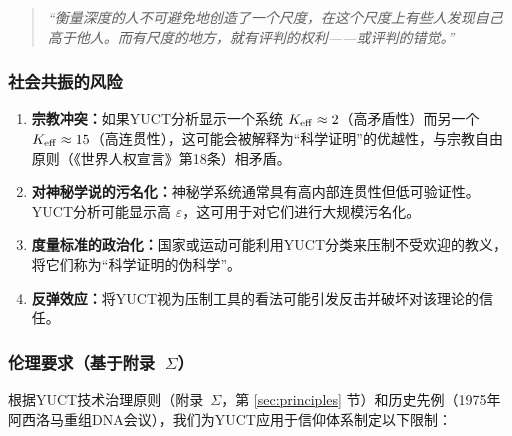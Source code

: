\documentclass[11pt,a4paper]{article}
\newcommand{\eps}{\varepsilon}
\begin{document}
	\begin{quote}
		\itshape
		“衡量深度的人不可避免地创造了一个尺度，在这个尺度上有些人发现自己高于他人。而有尺度的地方，就有评判的权利——或评判的错觉。”
	\end{quote}
	
	\subsubsection{社会共振的风险}
	
	\begin{enumerate}
		\item \textbf{宗教冲突：}如果YUCT分析显示一个系统 $\Keff \approx 2$（高矛盾性）而另一个 $\Keff \approx 15$（高连贯性），这可能会被解释为“科学证明”的优越性，与宗教自由原则（《世界人权宣言》第18条）相矛盾。
		
		\item \textbf{对神秘学说的污名化：}神秘学系统通常具有高内部连贯性但低可验证性。YUCT分析可能显示高 $\eps$，这可用于对它们进行大规模污名化。
		
		\item \textbf{度量标准的政治化：}国家或运动可能利用YUCT分类来压制不受欢迎的教义，将它们称为“科学证明的伪科学”。
		
		\item \textbf{反弹效应：}将YUCT视为压制工具的看法可能引发反击并破坏对该理论的信任。
	\end{enumerate}
	
	\subsubsection{伦理要求（基于附录~$\Sigma$）}
	
	根据YUCT技术治理原则（附录~$\Sigma$，第 \ref{sec:principles} 节）和历史先例（1975年阿西洛马重组DNA会议），我们为YUCT应用于信仰体系制定以下限制：
	
\end{document}
